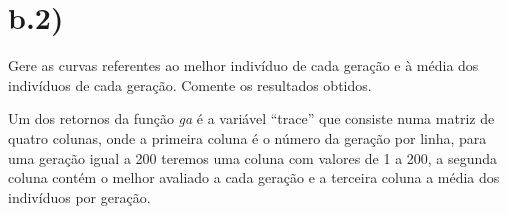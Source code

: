 \documentclass{article}
\begin{document}




\newpage
\section*{b.2)}

\begin{flushleft}
	Gere as curvas referentes ao melhor indivíduo de cada geração e
	à média dos indivíduos de cada geração. Comente os resultados
	obtidos.

	Um dos retornos da função \emph{ga} é a variável ``trace''
	que consiste numa matriz de quatro colunas, onde a primeira
	coluna é o número da geração por linha, para uma geração
	igual a 200 teremos uma coluna com valores de 1 a 200, a
	segunda coluna contém o melhor avaliado a cada
	geração e a terceira coluna a média dos indivíduos por
	geração.

\end{flushleft}



\end{document}
